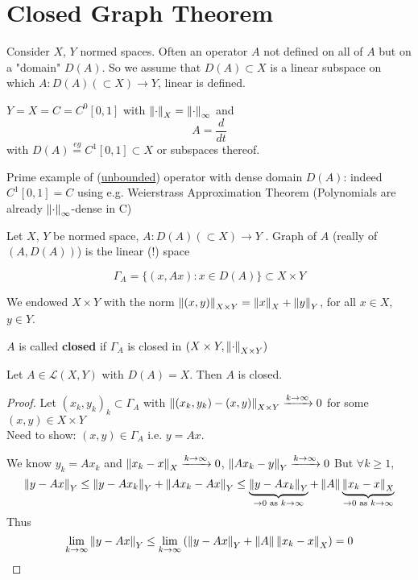 \documentclass{article}
\begin{document}
\section{Closed Graph Theorem}
Consider $X$, $Y$ normed spaces. Often an operator $A$ not defined on all of $A$ but on a "domain" $D(A)$. So we assume that 
$D(A)\subset X$ is a linear subspace on which $A:D(A)(\subset X)\to Y$, linear is defined.
\begin{example}\nl
$Y=X=C=C^0[0,1]$ with $\left\|{\cdot}\right\|_X=\left\|{\cdot}\right\|_\infty$ and 
$$A=\frac{d}{dt}$$
with $D(A)\stackrel{eg}{=}C^1[0,1]\subset X$ or subspaces thereof. 

Prime example of  (\underline{unbounded}) operator with dense domain $D(A)$: indeed $C^1[0,1]=C$ using e.g. Weierstrass Approximation Theorem (Polynomials are already $\left\|{\cdot}\right\|_\infty$-dense in C)
\end{example}
\begin{definition}\nl
Let $X$, $Y$ be normed space, $A:D(A)(\subset X)\to Y$ . Graph of $A$ (really  of $(A,D(A))$) is the linear (!) space  

$$
\Gamma_A=\{(x,Ax):x\in D(A)\}\subset X\times Y
$$  

We endowed $X\times Y$ with the norm $\left\|{(x,y)}\right\|_{X\times Y}=\left\|{x}\right\|_X+\left\|{y}\right\|_Y$, for all $x\in X$, $y\in Y$.  
    
\end{definition}

\begin{definition}
$A$ is called \textbf{closed} if $\Gamma_A$ is closed in  $(X\times Y,\left\|{\cdot}\right\|_{X\times Y})$
\end{definition}

\begin{example}
Let $A\in\mathcal{L}(X,Y)$ with $D(A)=X$. Then $A$ is closed.
\end{example}
\begin{proof}
	Let $(x_k,y_k)_k\subset \Gamma_A$  with $\left\|{(x_k,y_k)-(x,y)}\right\|_{X\times Y}\xrightarrow{k\to\infty}0$ for some $(x,y)\in X\times Y$\\
	Need to show: $(x,y)\in \Gamma_A$ i.e. $y=Ax$.   
 
	We know $ y_k=Ax_k$ and $\left\|{x_k-x}\right\|_X\xrightarrow{k\to\infty}0$, $\left\|{Ax_k-y}\right\|_Y\xrightarrow{k\to\infty}0$
	But $\forall k\geq 1$,
	$$\left\|{y-Ax}\right\|_Y\leq\left\|{y-Ax_k}\right\|_Y+\left\|{Ax_k-Ax}\right\|_Y
	\leq \underbrace{\left\|{y-Ax_k}\right\|_Y}_{\to0\text{ as } k\to\infty}+\left\|{A}\right\|\underbrace{\left\|{x_k-x}\right\|_X}_{\to0\text{ as } k\to\infty}$$
	Thus 
	$$\lim_{k\to\infty}\left\|{y-Ax}\right\|_Y\leq\lim_{k\to\infty}\left(\left\|{y-Ax}\right\|_Y+\left\|{A}\right\|\left\|{x_k-x}\right\|_X\right)=0$$
\end{proof}
\end{document}
